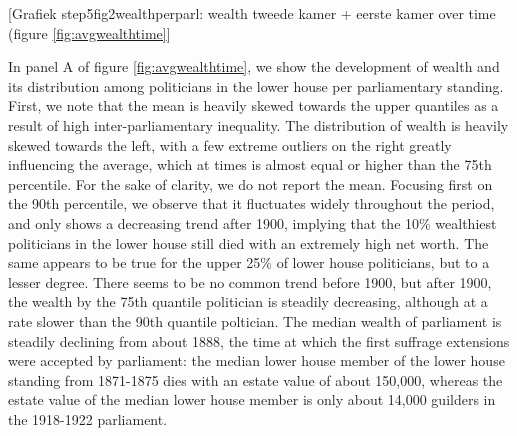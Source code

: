 \begin{center}    
    [Grafiek step5fig2wealthperparl: wealth tweede kamer + eerste kamer over time (figure \ref{fig:avgwealthtime}]
 \end{center}
 
    In panel A of figure \ref{fig:avgwealthtime}, we show the development of wealth and its distribution among politicians in the lower house per parliamentary standing. First, we note that the mean is heavily skewed towards the upper quantiles as a result of high inter-parliamentary inequality. The distribution of wealth is heavily skewed towards the left, with a few extreme outliers on the right greatly influencing the average, which at times is almost equal or higher than the 75th percentile. For the sake of clarity, we do not report the mean. Focusing first on the 90th percentile, we observe that it fluctuates widely throughout the period, and only shows a decreasing trend after 1900, implying that the 10\% wealthiest politicians in the lower house still died with an extremely high net worth. The same appears to be true for the upper 25\% of lower house politicians, but to a lesser degree. There seems to be no common trend before 1900, but after 1900, the wealth by the 75th quantile politician is steadily decreasing, although at a rate slower than the 90th quantile poltician.  The median wealth of parliament is steadily declining from about 1888, the time at which the first suffrage extensions were accepted by parliament: the median lower house member of the lower house standing from 1871-1875 dies with an estate value of about 150,000, whereas the estate value of the median lower house member is only about 14,000 guilders in the 1918-1922 parliament.
    

